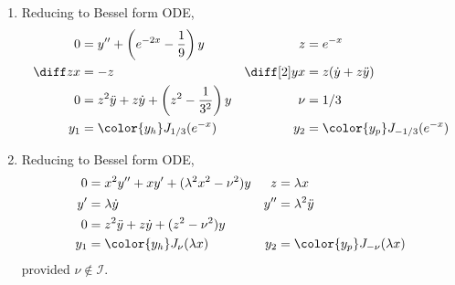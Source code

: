 \begin{enumerate}
    \item Reducing to Bessel form ODE,
          \begin{align}
              0                      & = y'' + \left( e^{-2x} - \frac{1}{9} \right) y &
              z                      & = e^{-x}                                         \\
              \diff zx               & = -z                                           &
              \diff[2] yx            & = z (\dot{y} + z\ddot{y})                        \\
              0                      & = z^2 \ddot{y} + z\dot{y} + \left( z^2 -
              \frac{1}{3^2} \right)y &
              \nu                    & = 1/3                                            \\
              y_1                    & = \color{y_h} J_{1/3}(e^{-x})                  &
              y_2                    & = \color{y_p} J_{-1/3}(e^{-x})
          \end{align}

    \item Reducing to Bessel form ODE,
          \begin{align}
              0   & = x^2y'' + xy' + (\lambda^2x^2 - \nu^2) y  &
              z   & = \lambda x                                  \\
              y'  & = \lambda \dot{y}                          &
              y'' & = \lambda^2 \ddot{y}                         \\
              0   & = z^2 \ddot{y} + z\dot{y} + (z^2 - \nu^2)y   \\
              y_1 & = \color{y_h} J_{\nu}(\lambda x)           &
              y_2 & = \color{y_p} J_{-\nu}(\lambda x)
          \end{align}
          provided $ \nu \not\in \mathcal{I}$.


\end{enumerate}
